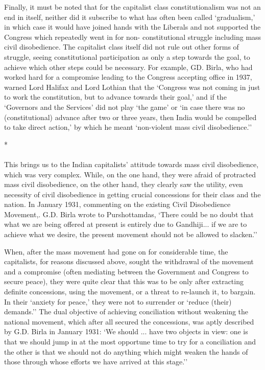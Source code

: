 Finally, it must be noted that for the capitalist class constitutionalism was not an end in itself, neither did it subscribe to what has often been called `gradualism,' in which case it would have joined hands with the Liberals and not supported the Congress which repeatedly went in for non- constitutional struggle including mass civil disobedience. The capitalist class itself did not rule out other forms of struggle, seeing constitutional participation as only a step towards the goal, to achieve which other steps could be necessary. For example, GD. Birla, who had worked hard for a compromise leading to the Congress accepting office in 1937, warned Lord Halifax and Lord Lothian that the `Congress was not coming in just to work the constitution, but to advance towards their goal,' and if the `Governors and the Services' did not play `the game' or `in case there was no (constitutional) advance after two or three years, then India would be compelled to take direct action,' by which he meant `non-violent mass civil disobedience.''

\begin{center}*\end{center}

\paragraph*{}


This brings us to the Indian capitalists' attitude towards mass civil disobedience, which was very complex. While, on the one hand, they were afraid of protracted mass civil disobedience, on the other hand, they clearly saw the utility, even necessity of civil disobedience in getting crucial concessions for their class and the nation. In January 1931, commenting on the existing Civil Disobedience Movement,. G.D. Birla wrote to Purshottamdas, `There could be no doubt that what we are being offered at present is entirely due to Gandhiji... if we are to achieve what we desire, the present movement should not be allowed to slacken.'' 

When, after the mass movement had gone on for considerable time, the capitalists, for reasons discussed above, sought the withdrawal of the movement and a compromise (often mediating between the Government and Congress to secure peace), they were quite clear that this was to be only after extracting definite concessions, using the movement, or a threat to re-launch it, to bargain. In their `anxiety for peace,' they were not to surrender or `reduce (their) demands.'' The dual objective of achieving conciliation without weakening the national movement, which after all secured the concessions, was aptly described by G.D. Birla in January 1931: `We should ... have two objects in view: one is that we should jump in at the most opportune time to try for a conciliation and the other is that we should not do anything which might weaken the hands of those through whose efforts we have arrived at this stage.'' 

